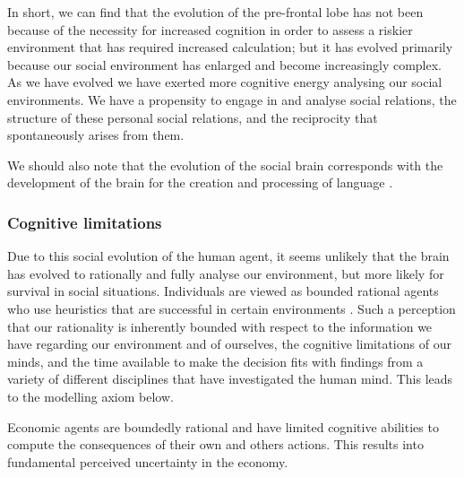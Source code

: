 In short, we can find that the evolution of the pre-frontal lobe has not been because of the necessity for increased cognition in order to assess a riskier environment that has required increased calculation; but it has evolved primarily because our social environment has enlarged and become increasingly complex. As we have evolved we have exerted more cognitive energy analysing our social environments. We have a propensity to engage in and analyse social relations, the structure of these personal social relations, and the reciprocity that spontaneously arises from them.

We should also note that the evolution of the social brain corresponds with the development of the brain for the creation and processing of language \citep{Dunbar1998b}.

\subsubsection{Cognitive limitations}

Due to this social evolution of the human agent, it seems unlikely that the brain has evolved to rationally and fully analyse our environment, but more likely for survival in social situations. Individuals are viewed as bounded rational agents who use heuristics that are successful in certain environments \citep{TverskyKahneman1974}. Such a perception that our rationality is inherently bounded with respect to the information we have regarding our environment and of ourselves, the cognitive limitations of our minds, and the time available to make the decision fits with findings from a variety of different disciplines that have investigated the human mind. This leads to the modelling axiom below.

\begin{axiom} \label{ax:boundedrationality}
Economic agents are boundedly rational and have limited cognitive abilities to compute the consequences of their own and others actions. This results into fundamental perceived uncertainty in the economy.
\end{axiom}


